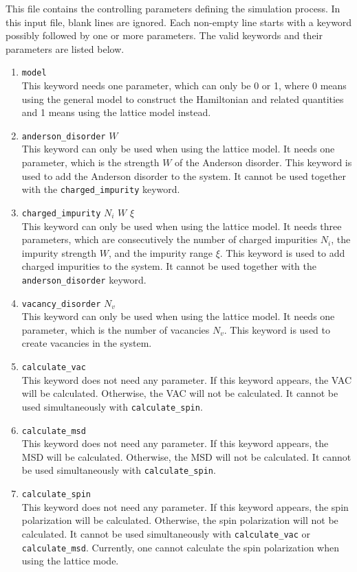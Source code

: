 \documentclass[12pt,a4paper]{report}
\begin{document}
This file contains the controlling parameters defining the simulation process. In this input file, blank lines are ignored. Each non-empty line starts with a keyword possibly followed by one or more parameters. The valid keywords and their parameters are listed below.
\begin{enumerate}
\item  \verb"model"\\
This keyword needs one parameter, which can only be 0 or 1, where 0 means using the general model to construct the Hamiltonian and related quantities and 1 means using the lattice model instead.
\item  \verb"anderson_disorder" $W$ \\
This keyword can only be used when using the lattice model. It needs one parameter, which is the strength $W$ of the Anderson disorder. This keyword is used to add the Anderson disorder to the system. It cannot be used together with the \verb"charged_impurity" keyword.
\item  \verb"charged_impurity" $N_i$ $W$ $\xi$ \\
This keyword can only be used when using the lattice model. It needs three parameters, which are consecutively the number of charged impurities $N_i$, the impurity strength $W$, and the impurity range $\xi$. This keyword is used to add charged impurities to the system. It cannot be used together with the \verb"anderson_disorder" keyword.
\item  \verb"vacancy_disorder" $N_v$ \\
This keyword can only be used when using the lattice model. It needs one parameter, which is the number of vacancies $N_v$. This keyword is used to create vacancies in the system.
\item \verb"calculate_vac"\\
This keyword does not need any parameter. If this keyword appears, the VAC will be calculated. Otherwise, the VAC will not be calculated. It cannot be used simultaneously with \verb"calculate_spin".
\item \verb"calculate_msd"\\
This keyword does not need any parameter. If this keyword appears, the MSD will be calculated. Otherwise, the MSD will not be calculated. It cannot be used simultaneously with \verb"calculate_spin".
\item \verb"calculate_spin" \\
This keyword does not need any parameter. If this keyword appears, the spin polarization will be calculated. Otherwise, the spin polarization will not be calculated. It cannot be used simultaneously with \verb"calculate_vac" or \verb"calculate_msd". Currently, one cannot calculate the spin polarization when using the lattice mode.

\end{enumerate}
\end{document}

